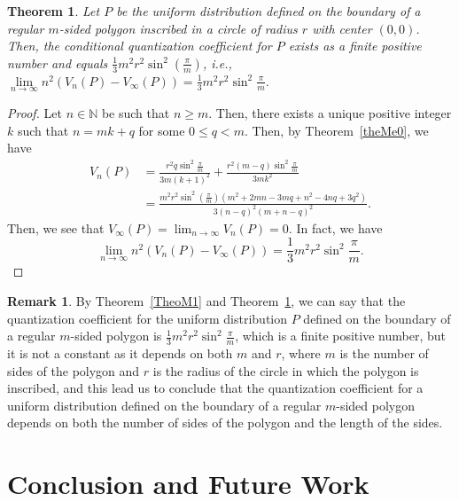 \documentclass[12pt, reqno]{amsart}
\theoremstyle{plain}
\newtheorem{theorem}[subsection]{Theorem}
\theoremstyle{definition}
\newtheorem{remark}[subsection]{Remark}
\newcommand{\D}[1]{\mathbb{#1}}%
\begin{document}
\begin{theorem}\label{theo45}
Let $P$ be the uniform distribution defined on the boundary of a regular $m$-sided polygon inscribed in a circle of radius $r$ with center $(0, 0)$. Then, the conditional quantization coefficient for $P$ exists as a finite positive number and equals $\frac{1}{3} m^2r^2 \sin ^2(\frac{\pi }{m})$, i.e.,
$\lim\limits_{n\to \infty} n^2 (V_n(P)-V_\infty(P))=\frac{1}{3} m^2 r^2 \sin ^2\frac{\pi }{m}.$
\end{theorem}

\begin{proof} Let $n\in \D N$ be such that $n\geq m$. Then, there exists a unique positive integer $k$ such that $n=mk+q$ for some $0\leq q<m$. Then, by Theorem~\ref{theMe0}, we have 
\begin{align*}  V_n(P)&=\frac {r^2q\sin^2\frac{\pi} m}{3m(k+1)^2}+ \frac {r^2(m-q)\sin^2\frac{\pi} m}{3mk^2}\\
&=\frac{m^2 r^2 \sin ^2\left(\frac{\pi }{m}\right) \left(m^2+2 m n-3 m q+n^2-4 n q+3 q^2\right)}{3 (n-q)^2 (m+n-q)^2}.
\end{align*} 
Then, we see that $V_{\infty}(P)=\lim_{n\to \infty} V_n(P)=0$. In fact, we have 
\[\lim\limits_{n\to \infty} n^2 (V_n(P)-V_\infty(P))=\frac{1}{3} m^2 r^2 \sin ^2\frac{\pi }{m}.\]
\end{proof}

\begin{remark} \label{rem8} 
By Theorem~\ref{TheoM1} and Theorem~\ref{theo45}, we can say that the quantization coefficient for the uniform distribution $P$ defined on the boundary of a regular $m$-sided polygon is $\frac{1}{3} m^2r^2 \sin ^2\frac{\pi }{m}$, which is a finite positive number, but it is not a constant as it depends on both $m$ and $r$, where $m$ is the number of sides of the polygon and $r$ is the radius of the circle in which the polygon is inscribed, and this lead us to conclude that the quantization coefficient for a uniform distribution defined on the boundary of a regular $m$-sided polygon depends on both the number of sides of the polygon and the length of the sides.  
\end{remark} 

\section{Conclusion and Future Work}
 
\end{document}
